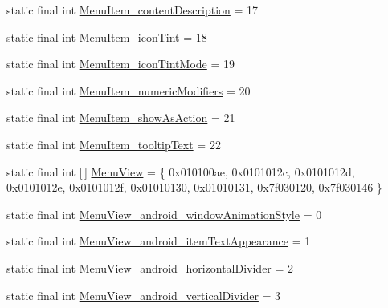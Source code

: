 \begin{DoxyCompactItemize}
\item 
static final int \mbox{\hyperlink{classandroid_1_1support_1_1v7_1_1appcompat_1_1R_1_1styleable_a28b9954ae9cc09471efd1f553606c5e9}{Menu\+Item\+\_\+content\+Description}} = 17
\item 
static final int \mbox{\hyperlink{classandroid_1_1support_1_1v7_1_1appcompat_1_1R_1_1styleable_a3abd86e50fcdc32ca13340c7033bd4c3}{Menu\+Item\+\_\+icon\+Tint}} = 18
\item 
static final int \mbox{\hyperlink{classandroid_1_1support_1_1v7_1_1appcompat_1_1R_1_1styleable_a190701212a8e0e202e6fbe0c74fcff21}{Menu\+Item\+\_\+icon\+Tint\+Mode}} = 19
\item 
static final int \mbox{\hyperlink{classandroid_1_1support_1_1v7_1_1appcompat_1_1R_1_1styleable_a10841856d9d1e9a0f5dded114b5e1bec}{Menu\+Item\+\_\+numeric\+Modifiers}} = 20
\item 
static final int \mbox{\hyperlink{classandroid_1_1support_1_1v7_1_1appcompat_1_1R_1_1styleable_a90bfa8cb2820ac63ee4de421e3c22817}{Menu\+Item\+\_\+show\+As\+Action}} = 21
\item 
static final int \mbox{\hyperlink{classandroid_1_1support_1_1v7_1_1appcompat_1_1R_1_1styleable_a248a9115038e8b04bb59751dcc23a2dd}{Menu\+Item\+\_\+tooltip\+Text}} = 22
\item 
static final int \mbox{[}$\,$\mbox{]} \mbox{\hyperlink{classandroid_1_1support_1_1v7_1_1appcompat_1_1R_1_1styleable_ab45f4f3fe3b636a3730a9fb26bfa1050}{Menu\+View}} = \{ 0x010100ae, 0x0101012c, 0x0101012d, 0x0101012e, 0x0101012f, 0x01010130, 0x01010131, 0x7f030120, 0x7f030146 \}
\item 
static final int \mbox{\hyperlink{classandroid_1_1support_1_1v7_1_1appcompat_1_1R_1_1styleable_abd54322c6ea26d63855ac5486725cb73}{Menu\+View\+\_\+android\+\_\+window\+Animation\+Style}} = 0
\item 
static final int \mbox{\hyperlink{classandroid_1_1support_1_1v7_1_1appcompat_1_1R_1_1styleable_a13321c3d5c3fe41c38cdb5973b88c94f}{Menu\+View\+\_\+android\+\_\+item\+Text\+Appearance}} = 1
\item 
static final int \mbox{\hyperlink{classandroid_1_1support_1_1v7_1_1appcompat_1_1R_1_1styleable_aec80c088fe2673b404870a06d5cda178}{Menu\+View\+\_\+android\+\_\+horizontal\+Divider}} = 2
\item 
static final int \mbox{\hyperlink{classandroid_1_1support_1_1v7_1_1appcompat_1_1R_1_1styleable_a99d74a7d96d721513a733daa3bf135b0}{Menu\+View\+\_\+android\+\_\+vertical\+Divider}} = 3
\item 

\end{DoxyCompactItemize}
